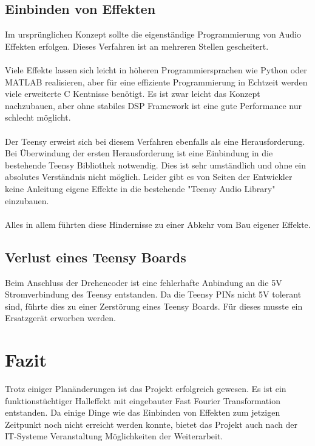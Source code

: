 \documentclass[12pt]{article}
\begin{document}
\subsection{Einbinden von Effekten}
Im ursprünglichen Konzept sollte die eigenständige Programmierung von Audio Effekten erfolgen. 
Dieses Verfahren ist an mehreren Stellen gescheitert. 
\\
\\
Viele Effekte lassen sich leicht in höheren Programmiersprachen
wie Python oder MATLAB realisieren, aber für eine effiziente Programmierung in Echtzeit werden viele erweiterte C Kentnisse benötigt. 
Es ist zwar leicht das Konzept nachzubauen, aber ohne stabiles DSP Framework ist eine gute 
Performance nur schlecht möglicht. 
\\
\\
Der Teensy erweist sich bei diesem Verfahren ebenfalls als eine Herausforderung. Bei Überwindung der ersten Herausforderung 
ist eine Einbindung in die bestehende Teensy Bibliothek notwendig. Dies ist sehr umständlich und ohne ein absolutes Verständnis nicht möglich. 
Leider gibt es von Seiten der Entwickler keine Anleitung eigene Effekte in die bestehende "Teensy Audio Library" einzubauen. 
\\
\\
Alles in allem führten diese Hindernisse zu einer Abkehr vom Bau eigener Effekte.  
\subsection{Verlust eines Teensy Boards}
Beim Anschluss der Drehencoder ist eine fehlerhafte Anbindung an die 5V Stromverbindung des Teensy entstanden. 
Da die Teensy PINs nicht 5V tolerant sind, führte dies zu einer Zerstörung eines Teensy Boards.
Für dieses musste ein Ersatzgerät erworben werden. 

  
\section{Fazit}
Trotz einiger Planänderungen ist das Projekt erfolgreich gewesen. Es ist ein funktionstüchtiger Halleffekt mit eingebauter Fast Fourier Transformation
entstanden.
Da einige Dinge wie das Einbinden von Effekten zum jetzigen Zeitpunkt noch nicht erreicht werden konnte, bietet das Projekt auch nach der IT-Systeme 
Veranstaltung Möglichkeiten der Weiterarbeit.  
\end{document}
